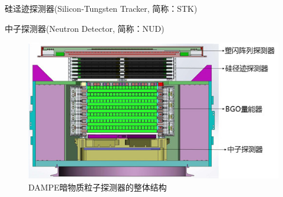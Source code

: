 硅迳迹探测器(Silicon-Tungsten Tracker, 简称：STK)

中子探测器(Neutron Detector, 简称：NUD)

\begin{figure}
\centering
\includegraphics[width=0.8\linewidth]{chap/introduction/fig/dampe_structure_2}
\caption{DAMPE暗物质粒子探测器的整体结构}
\label{fig:dampe_structure}
\end{figure}
